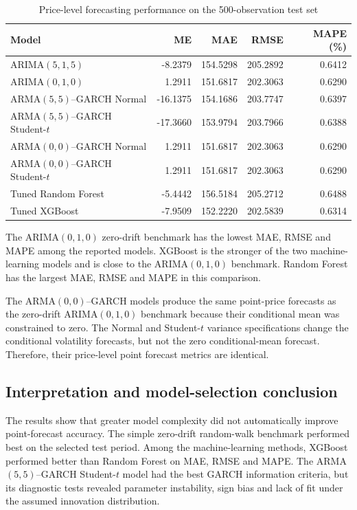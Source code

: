 \documentclass[10pt,a4paper]{article}
\begin{document}
\begin{table}[H]
\centering
\caption{Price-level forecasting performance on the 500-observation test set}
\small
\begin{tabular}{lrrrr}
\toprule
Model & ME & MAE & RMSE & MAPE (\%) \\
\midrule
ARIMA$(5,1,5)$ & -8.2379 & 154.5298 & 205.2892 & 0.6412 \\
ARIMA$(0,1,0)$ & 1.2911 & 151.6817 & 202.3063 & 0.6290 \\
ARMA$(5,5)$--GARCH Normal & -16.1375 & 154.1686 & 203.7747 & 0.6397 \\
ARMA$(5,5)$--GARCH Student-$t$ & -17.3660 & 153.9794 & 203.7966 & 0.6388 \\
ARMA$(0,0)$--GARCH Normal & 1.2911 & 151.6817 & 202.3063 & 0.6290 \\
ARMA$(0,0)$--GARCH Student-$t$ & 1.2911 & 151.6817 & 202.3063 & 0.6290 \\
Tuned Random Forest & -5.4442 & 156.5184 & 205.2712 & 0.6488 \\
Tuned XGBoost & -7.9509 & 152.2220 & 202.5839 & 0.6314 \\
\bottomrule
\end{tabular}
\label{tab:final_results}
\end{table}

The ARIMA$(0,1,0)$ zero-drift benchmark has the lowest MAE, RMSE and MAPE among the reported models. XGBoost is the stronger of the two machine-learning models and is close to the ARIMA$(0,1,0)$ benchmark. Random Forest has the largest MAE, RMSE and MAPE in this comparison.

The ARMA$(0,0)$--GARCH models produce the same point-price forecasts as the zero-drift ARIMA$(0,1,0)$ benchmark because their conditional mean was constrained to zero. The Normal and Student-$t$ variance specifications change the conditional volatility forecasts, but not the zero conditional-mean forecast. Therefore, their price-level point forecast metrics are identical.

\subsection{Interpretation and model-selection conclusion}

The results show that greater model complexity did not automatically improve point-forecast accuracy. The simple zero-drift random-walk benchmark performed best on the selected test period. Among the machine-learning methods, XGBoost performed better than Random Forest on MAE, RMSE and MAPE. The ARMA$(5,5)$--GARCH Student-$t$ model had the best GARCH information criteria, but its diagnostic tests revealed parameter instability, sign bias and lack of fit under the assumed innovation distribution.
\end{document}
